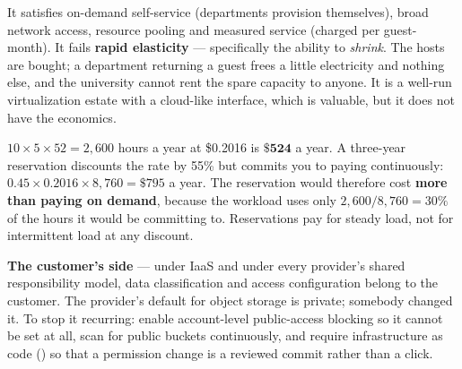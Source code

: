 \begin{ans}
  \item It satisfies on-demand self-service (departments provision themselves),
        broad network access, resource pooling and measured service (charged per
        guest-month). It fails \textbf{rapid elasticity} --- specifically the
        ability to \emph{shrink}. The hosts are bought; a department returning a
        guest frees a little electricity and nothing else, and the university
        cannot rent the spare capacity to anyone. It is a well-run
        virtualization estate with a cloud-like interface, which is valuable,
        but it does not have the economics.
  \item $10 \times 5 \times 52 = 2{,}600$ hours a year at \$0.2016 is
        $\mathbf{\$524}$ a year. A three-year reservation discounts the rate by
        55\% but commits you to paying continuously:
        $0.45 \times 0.2016 \times 8{,}760 = \$795$ a year. The reservation
        would therefore cost \textbf{more than paying on demand}, because the
        workload uses only $2{,}600/8{,}760 = 30\%$ of the hours it would be
        committing to. Reservations pay for steady load, not for intermittent
        load at any discount.
  \item \textbf{The customer's side} --- under IaaS and under every provider's
        shared responsibility model, data classification and access
        configuration belong to the customer. The provider's default for object
        storage is private; somebody changed it. To stop it recurring: enable
        account-level public-access blocking so it cannot be set at all, scan
        for public buckets continuously, and require infrastructure as code
        () so that a permission change is a reviewed commit
        rather than a click.
\end{ans}


